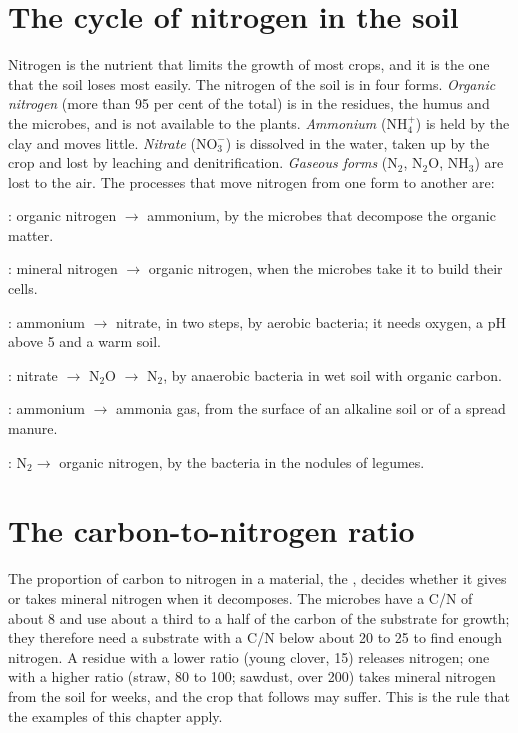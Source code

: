 \section{The cycle of nitrogen in the soil}
Nitrogen is the nutrient that limits the growth of most crops, and it is the one that the soil loses most easily. The nitrogen of the soil is in four forms. \emph{Organic nitrogen} (more than 95 per cent of the total) is in the residues, the humus and the microbes, and is not available to the plants. \emph{Ammonium} ($\mathrm{NH_4^+}$) is held by the clay and moves little. \emph{Nitrate} ($\mathrm{NO_3^-}$) is dissolved in the water, taken up by the crop and lost by leaching and denitrification. \emph{Gaseous forms} ($\mathrm N_2$, $\mathrm{N_2O}$, $\mathrm{NH_3}$) are lost to the air. The processes that move nitrogen from one form to another are:
\begin{exlist}
\item {}: organic nitrogen $\to$ ammonium, by the microbes that decompose the organic matter.
\item {}: mineral nitrogen $\to$ organic nitrogen, when the microbes take it to build their cells.
\item {}: ammonium $\to$ nitrate, in two steps, by aerobic bacteria; it needs oxygen, a pH above 5 and a warm soil.
\item {}: nitrate $\to$ $\mathrm{N_2O}$ $\to$ $\mathrm{N_2}$, by anaerobic bacteria in wet soil with organic carbon.
\item {}: ammonium $\to$ ammonia gas, from the surface of an alkaline soil or of a spread manure.
\item {}: $\mathrm N_2\to$ organic nitrogen, by the bacteria in the nodules of legumes.
\end{exlist}

\section{The carbon-to-nitrogen ratio}
The proportion of carbon to nitrogen in a material, the , decides whether it gives or takes mineral nitrogen when it decomposes. The microbes have a C/N of about 8 and use about a third to a half of the carbon of the substrate for growth; they therefore need a substrate with a C/N below about 20 to 25 to find enough nitrogen. A residue with a lower ratio (young clover, 15) releases nitrogen; one with a higher ratio (straw, 80 to 100; sawdust, over 200) takes mineral nitrogen from the soil for weeks, and the crop that follows may suffer. This is the rule that the examples of this chapter apply.

